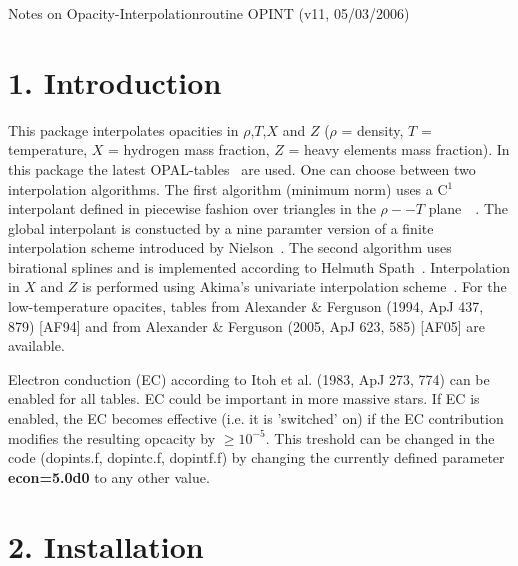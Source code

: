 



\nopagenumbers
\maketoc

\centerline{\largebf Notes on Opacity-Interpolationroutine OPINT 
                     (v11, 05/03/2006)}

\subsectionskip
\section{1. Introduction}
This package interpolates opacities in $\rho$,$T$,$X$ and $Z$ ($\rho$ = density,
$T$ = temperature, $X$ = hydrogen mass fraction, $Z$ = heavy elements mass fraction).
In this package the latest OPAL-tables~\cite{rog95} are used.
One can choose between two interpolation algorithms.
The first algorithm (minimum norm) uses a C$^1$ interpolant defined in 
piecewise fashion
over triangles in the $\rho--T$ plane~\cite{acm677}~\cite{niel83}.
The global interpolant is constucted by a nine paramter version of a
finite interpolation scheme introduced by Nielson~\cite{niel80}.
The second algorithm uses birational splines and is implemented
according to Helmuth Spath~\cite{Spa91}.
Interpolation in $X$ and $Z$ is performed using Akima's univariate interpolation
scheme~\cite{acm433,acm697}.
For the low-temperature opacites, tables from 
Alexander \& Ferguson (1994, ApJ 437, 879) [AF94] and from
Alexander \& Ferguson (2005, ApJ 623, 585) [AF05] are available.

Electron conduction (EC) according to Itoh et al. (1983, ApJ 273, 774) can be 
enabled for all tables. EC could be important in more massive stars.
If EC is enabled, the EC becomes effective (i.e. it
is 'switched' on) if the EC contribution modifies the resulting opcacity
by $\ge 10^{-5}$. This treshold can be changed in the code (dopints.f,
dopintc.f, dopintf.f) by changing the currently defined parameter {\bf econ=5.0d0}
to any other value.
\medskip
\section{2. Installation}
\vskip-2mm

